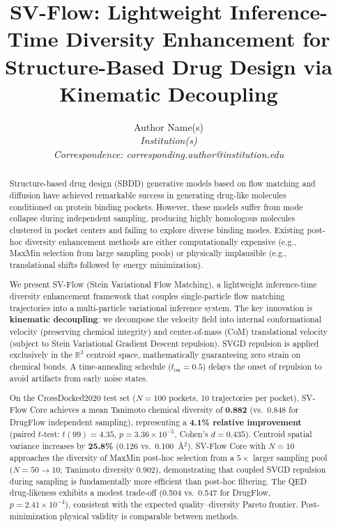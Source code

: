 \documentclass[a4paper,11pt]{article}
\title{\textbf{SV-Flow: Lightweight Inference-Time Diversity Enhancement for\\
       Structure-Based Drug Design via Kinematic Decoupling}}
\author{Author Name(s)\\[3pt]
        \small\textit{Institution(s)}\\[3pt]
        \small\textit{Correspondence: corresponding.author@institution.edu}}
\date{}
\begin{document}
\maketitle

\begin{abstract}
Structure-based drug design (SBDD) generative models based on flow matching and
diffusion have achieved remarkable success in generating drug-like molecules
conditioned on protein binding pockets.  However, these models suffer from mode
collapse during independent sampling, producing highly homologous molecules
clustered in pocket centers and failing to explore diverse binding modes.
Existing post-hoc diversity enhancement methods are either computationally
expensive (e.g., MaxMin selection from large sampling pools) or physically
implausible (e.g., translational shifts followed by energy minimization).

We present SV-Flow (Stein Variational Flow Matching), a lightweight
inference-time diversity enhancement framework that couples single-particle flow
matching trajectories into a multi-particle variational inference system.  The
key innovation is \textbf{kinematic decoupling}: we decompose the velocity field
into internal conformational velocity (preserving chemical integrity) and
center-of-mass (CoM) translational velocity (subject to Stein Variational
Gradient Descent repulsion).  SVGD repulsion is applied exclusively in the
$\mathbb{R}^3$ centroid space, mathematically guaranteeing zero strain on
chemical bonds.  A time-annealing schedule ($t_{\text{on}}=0.5$) delays the
onset of repulsion to avoid artifacts from early noise states.

On the CrossDocked2020 test set ($N=100$ pockets, 10 trajectories per pocket),
SV-Flow Core achieves a mean Tanimoto chemical diversity of \textbf{0.882}
(vs.\ 0.848 for DrugFlow independent sampling), representing a \textbf{4.1\%
relative improvement} (paired $t$-test: $t(99)=4.35$, $p=3.36 \times 10^{-5}$,
Cohen's $d=0.435$).  Centroid spatial variance increases by \textbf{25.8\%}
(0.126 vs.\ 0.100~\AA$^2$).  SV-Flow Core with $N=10$ approaches the diversity
of MaxMin post-hoc selection from a $5\times$ larger sampling pool
($N=50\rightarrow 10$; Tanimoto diversity 0.902), demonstrating that coupled
SVGD repulsion during sampling is fundamentally more efficient than post-hoc
filtering.  The QED drug-likeness exhibits a modest trade-off (0.504 vs.\ 0.547
for DrugFlow, $p=2.41 \times 10^{-4}$), consistent with the expected
quality--diversity Pareto frontier.  Post-minimization physical validity is
comparable between methods.


\end{abstract}
\end{document}
